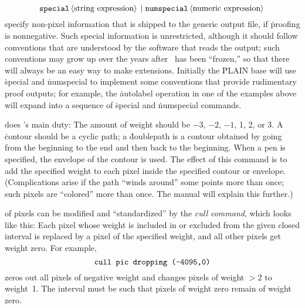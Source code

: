  $$\hbox{\.{special}\<string expression>\alt
\.{numspecial}\<numeric expression>}$$ specify non-pixel information that
is shipped to the generic output file, if \.{proofing} is nonnegative.
Such special information is unrestricted, although it should follow
conventions that are understood by the software that reads the output;
such conventions may grow up over the years after \MF\ has been
``frozen,'' so that there will always be an easy way to make extensions.
Initially the \.{PLAIN} base will use \.{special} and \.{numspecial} to
implement some conventions that provide rudimentary proof outputs; for
example, the \.{autolabel} operation in one of the examples above will
expand into a sequence of \.{special} and \.{numspecial} commands.

 does \MF's main duty:
The amount of weight should be $-3$, $-2$, $-1$, 1, 2, or 3.
A \.{contour} should be a cyclic path; a \.{doublepath} is a contour
obtained by going from the beginning to the end and then back to the beginning.
When a pen is specified, the envelope of the contour is used.
The effect of this command is to add the specified weight to each pixel
inside the specified contour or envelope. (Complications arise if the
path ``winds around'' some points more than once; such pixels are
``colored'' more than once. The manual will explain this further.)

\@Arrays of pixels can be modified and ``standardized'' by the {\it cull
command}, which looks like this:
Each pixel whose weight is included in or excluded from the given closed
interval is replaced by a pixel of the specified weight,
and all other pixels get weight zero. For example,
$$\hbox{\tt cull pic dropping (-4095,0)}$$
zeros out all pixels of negative weight and changes pixels of weight $>2$
to weight~1. The interval must be such that
pixels of weight zero remain of weight zero.

